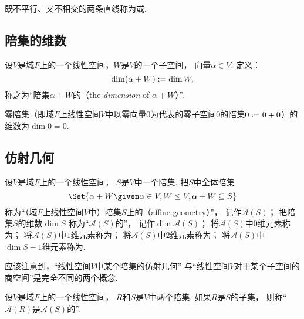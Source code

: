 既不平行、又不相交的两条直线称为或.

\subsection{陪集的维数}
\begin{definition}
设\(V\)是域\(F\)上的一个线性空间，\(W\)是\(V\)的一个子空间，
向量\(\alpha \in V\).
定义：\begin{equation}
	\dim(\alpha + W)
	:=
	\dim W,
\end{equation}
称之为“陪集\(\alpha + W\)的（the \emph{dimension} of \(\alpha + W\)）”.
\end{definition}

\begin{example}
零陪集（即域\(F\)上线性空间\(V\)中以零向量\(0\)为代表的零子空间\(0\)的陪集\(0 := 0+0\)）的
维数为\(\dim 0 = 0\).
\end{example}

\subsection{仿射几何}
\begin{definition}
设\(V\)是域\(F\)上的一个线性空间，
\(S\)是\(V\)中一个陪集.
把\(S\)中全体陪集\begin{equation*}
	\Set{
		\alpha + W
		\given
		\alpha \in V,
		W \AlgebraSubstructure V,
		\alpha + W \subseteq S
	}
\end{equation*}
称为“（域\(F\)上线性空间\(V\)中）陪集\(S\)上的（affine geometry）”，
记作\(\mathcal{A}(S)\)；
把陪集\(S\)的维数\(\dim S\)
称为“\(\mathcal{A}(S)\)的”，
记作\(\dim\mathcal{A}(S)\)；
将\(\mathcal{A}(S)\)中\(0\)维元素称为；
将\(\mathcal{A}(S)\)中\(1\)维元素称为；
将\(\mathcal{A}(S)\)中\(2\)维元素称为；
将\(\mathcal{A}(S)\)中\(\dim S-1\)维元素称为.
\end{definition}
\begin{remark}
应该注意到，“线性空间\(V\)中某个陪集的仿射几何”
与“线性空间\(V\)对于某个子空间的商空间”是完全不同的两个概念.
\end{remark}

\begin{definition}
设\(V\)是域\(F\)上的一个线性空间，
\(R\)和\(S\)是\(V\)中两个陪集.
如果\(R\)是\(S\)的子集，
则称“\(\mathcal{A}(R)\)是\(\mathcal{A}(S)\)的”.
\end{definition}

